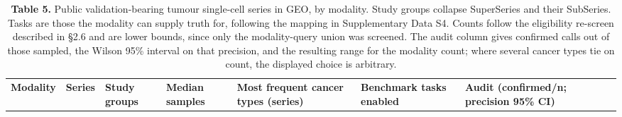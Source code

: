 \documentclass{article}
\begin{document}
\begin{longtable}[l]{@{}
  >{\raggedright\arraybackslash}p{}
  >{\raggedright\arraybackslash}p{}
  >{\raggedright\arraybackslash}p{}
  >{\raggedright\arraybackslash}p{}
  >{\raggedright\arraybackslash}p{}
  >{\raggedright\arraybackslash}p{}
  >{\raggedright\arraybackslash}p{}
  >{\raggedright\arraybackslash}p{}@{}}
\caption{\textbf{Table 5.} Public validation-bearing tumour single-cell series in
GEO, by modality. Study groups collapse SuperSeries and their SubSeries.
Tasks are those the modality can supply truth for, following the mapping
in Supplementary Data S4. Counts follow the eligibility re-screen
described in §2.6 and are lower bounds, since only the modality-query
union was screened. The audit column gives confirmed calls out of those
sampled, the Wilson 95\% interval on that precision, and the resulting
range for the modality count; where several cancer types tie on count,
the displayed choice is arbitrary.}\tabularnewline
\toprule
\begin{minipage}[b]{\linewidth}\raggedright
\textbf{Modality}
\end{minipage} & \begin{minipage}[b]{\linewidth}\raggedright
\textbf{Series}
\end{minipage} & \begin{minipage}[b]{\linewidth}\raggedright
\textbf{Study groups}
\end{minipage} & \begin{minipage}[b]{\linewidth}\raggedright
\textbf{Median samples}
\end{minipage} & \begin{minipage}[b]{\linewidth}\raggedright
\textbf{Most frequent cancer types (series)}
\end{minipage} & \begin{minipage}[b]{\linewidth}\raggedright
\textbf{Benchmark tasks enabled}
\end{minipage} & \begin{minipage}[b]{\linewidth}\raggedright
\textbf{Audit (confirmed/n; precision 95\% CI)}
\end{minipage} & \begin{minipage}[b]{\linewidth}\raggedright

\end{minipage}
\end{longtable}
\end{document}
